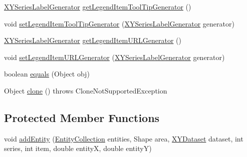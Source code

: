 \begin{DoxyCompactItemize}
\mbox{\hyperlink{interfaceorg_1_1jfree_1_1chart_1_1labels_1_1_x_y_series_label_generator}{X\+Y\+Series\+Label\+Generator}} \mbox{\hyperlink{classorg_1_1jfree_1_1chart_1_1renderer_1_1_default_polar_item_renderer_aa4a460957ed7dc7bbb9aff598f01958c}{get\+Legend\+Item\+Tool\+Tip\+Generator}} ()
\item 
void \mbox{\hyperlink{classorg_1_1jfree_1_1chart_1_1renderer_1_1_default_polar_item_renderer_a7fa6c62b2e0f8dbcf54924e6703ff591}{set\+Legend\+Item\+Tool\+Tip\+Generator}} (\mbox{\hyperlink{interfaceorg_1_1jfree_1_1chart_1_1labels_1_1_x_y_series_label_generator}{X\+Y\+Series\+Label\+Generator}} generator)
\item 
\mbox{\hyperlink{interfaceorg_1_1jfree_1_1chart_1_1labels_1_1_x_y_series_label_generator}{X\+Y\+Series\+Label\+Generator}} \mbox{\hyperlink{classorg_1_1jfree_1_1chart_1_1renderer_1_1_default_polar_item_renderer_a11bfd005168c27b4d10395b74c7ca441}{get\+Legend\+Item\+U\+R\+L\+Generator}} ()
\item 
void \mbox{\hyperlink{classorg_1_1jfree_1_1chart_1_1renderer_1_1_default_polar_item_renderer_a38cde3541e3a1b237ffad39b0464e335}{set\+Legend\+Item\+U\+R\+L\+Generator}} (\mbox{\hyperlink{interfaceorg_1_1jfree_1_1chart_1_1labels_1_1_x_y_series_label_generator}{X\+Y\+Series\+Label\+Generator}} generator)
\item 
boolean \mbox{\hyperlink{classorg_1_1jfree_1_1chart_1_1renderer_1_1_default_polar_item_renderer_aba0dfda73b8ccd5602de7a4e0ba1aa07}{equals}} (Object obj)
\item 
Object \mbox{\hyperlink{classorg_1_1jfree_1_1chart_1_1renderer_1_1_default_polar_item_renderer_a36e5b96fa7e2275bb4e9fe5ac271cde0}{clone}} ()  throws Clone\+Not\+Supported\+Exception 
\end{DoxyCompactItemize}
\subsection*{Protected Member Functions}
\begin{DoxyCompactItemize}
\item 
void \mbox{\hyperlink{classorg_1_1jfree_1_1chart_1_1renderer_1_1_default_polar_item_renderer_a10b53c4d818fce5da090bee0f15550ac}{add\+Entity}} (\mbox{\hyperlink{interfaceorg_1_1jfree_1_1chart_1_1entity_1_1_entity_collection}{Entity\+Collection}} entities, Shape area, \mbox{\hyperlink{interfaceorg_1_1jfree_1_1data_1_1xy_1_1_x_y_dataset}{X\+Y\+Dataset}} dataset, int series, int item, double entityX, double entityY)
\end{DoxyCompactItemize}
